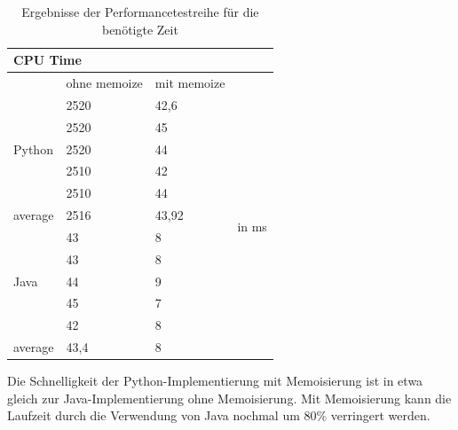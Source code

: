 \begin{table}[H]
    \centering
    \begin{tabular}{|l|ll|l|}
        \hline
        \multicolumn{4}{|l|}{\textbf{CPU Time}}                                        \\ \hline
                                & ohne memoize & mit memoize &                         \\ \hline
        \multirow{5}{*}{Python} & 2520         & 42,6        & \multirow{12}{*}{in ms} \\
                                & 2520         & 45          &                         \\
                                & 2520         & 44          &                         \\
                                & 2510         & 42          &                         \\
                                & 2510         & 44          &                         \\ \cline{1-3}
        average                 & 2516         & 43,92       &                         \\ \cline{1-3}
        \multirow{5}{*}{Java}   & 43           & 8           &                         \\
                                & 43           & 8           &                         \\
                                & 44           & 9           &                         \\
                                & 45           & 7           &                         \\
                                & 42           & 8           &                         \\ \cline{1-3}
        average                 & 43,4         & 8           &                         \\ \hline
    \end{tabular}
    \caption{Ergebnisse der Performancetestreihe für die benötigte Zeit}
\end{table}

Die Schnelligkeit der Python-Implementierung mit Memoisierung ist in etwa gleich zur Java-Implementierung 
ohne Memoisierung. Mit Memoisierung kann die Laufzeit durch die Verwendung von Java nochmal um 80\% verringert 
werden.